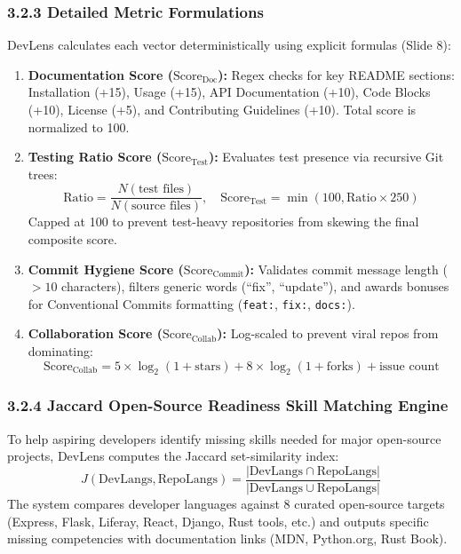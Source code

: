 \documentclass[12pt,a4paper]{article}
\begin{document}
\subsubsection{3.2.3 Detailed Metric Formulations}
DevLens calculates each vector deterministically using explicit formulas (Slide 8):
\begin{enumerate}
    \item \textbf{Documentation Score ($\text{Score}_{\text{Doc}}$):} Regex checks for key README sections: Installation (+15), Usage (+15), API Documentation (+10), Code Blocks (+10), License (+5), and Contributing Guidelines (+10). Total score is normalized to 100.
    \item \textbf{Testing Ratio Score ($\text{Score}_{\text{Test}}$):} Evaluates test presence via recursive Git trees:
    \begin{equation}
    \text{Ratio} = \frac{N(\text{test files})}{N(\text{source files})}, \quad \text{Score}_{\text{Test}} = \min(100, \text{Ratio} \times 250)
    \end{equation}
    Capped at 100 to prevent test-heavy repositories from skewing the final composite score.
    \item \textbf{Commit Hygiene Score ($\text{Score}_{\text{Commit}}$):} Validates commit message length ($>10$ characters), filters generic words (``fix'', ``update''), and awards bonuses for Conventional Commits formatting (\texttt{feat:}, \texttt{fix:}, \texttt{docs:}).
    \item \textbf{Collaboration Score ($\text{Score}_{\text{Collab}}$):} Log-scaled to prevent viral repos from dominating:
    \begin{equation}
    \text{Score}_{\text{Collab}} = 5 \times \log_2(1 + \text{stars}) + 8 \times \log_2(1 + \text{forks}) + \text{issue count}
    \end{equation}
\end{enumerate}

\subsubsection{3.2.4 Jaccard Open-Source Readiness Skill Matching Engine}
To help aspiring developers identify missing skills needed for major open-source projects, DevLens computes the Jaccard set-similarity index:
\begin{equation}
J(\text{DevLangs}, \text{RepoLangs}) = \frac{|\text{DevLangs} \cap \text{RepoLangs}|}{|\text{DevLangs} \cup \text{RepoLangs}|}
\end{equation}
The system compares developer languages against 8 curated open-source targets (Express, Flask, Liferay, React, Django, Rust tools, etc.) and outputs specific missing competencies with documentation links (MDN, Python.org, Rust Book).
\end{document}
